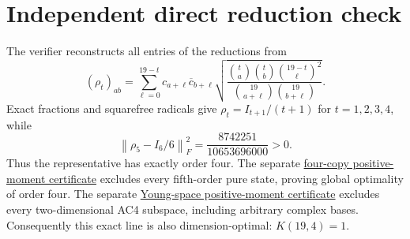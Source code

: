 \documentclass[11pt]{article}
\begin{document}
\section*{Independent direct reduction check}
The verifier reconstructs all entries of the reductions from
\[
 (\rho_t)_{ab}=\sum_{\ell=0}^{19-t}c_{a+\ell}\overline c_{b+\ell}
 \sqrt{\frac{\binom ta\binom tb\binom{19-t}{\ell}^{2}}
 {\binom{19}{a+\ell}\binom{19}{b+\ell}}}.
\]
Exact fractions and squarefree radicals give $\rho_t=I_{t+1}/(t+1)$
for $t=1,2,3,4$, while
\[
 \left\|\rho_5-I_6/6\right\|_F^2=\frac{8742251}{10653696000}>0.
\]
Thus the representative has exactly order four. The separate
\href{../n19-t5/proof.tex}{four-copy positive-moment certificate} excludes every
fifth-order pure state, proving global optimality of order four.
The separate \href{exclusion/proof.tex}{Young-space positive-moment certificate} excludes every two-dimensional AC4 subspace, including arbitrary complex bases. Consequently this exact line is also dimension-optimal: $K(19,4)=1$.
\end{document}

